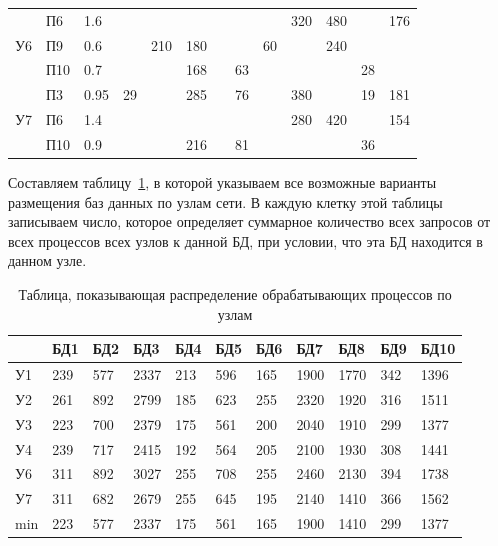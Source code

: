\documentclass[russian,utf8,emptystyle]{eskdtext}
\begin{document}
\begin{longtable}{p{0.6cm}|p{1cm}|p{1cm}|p{1cm}|p{1cm}|p{1cm}|p{1cm}|p{1cm}|p{1cm}|p{1cm}|p{1cm}|p{1cm}|p{1cm}}
\hline
\multirow{3}{*}{У6}&  П6         & 1.6   &     &      &      &      &      &      & 320  & 480  &      & 176   \\
                   &  П9         & 0.6   &     & 210  & 180  &      &      & 60   &      & 240  &      &       \\
                   &  П10        & 0.7   &     &      & 168  &      & 63   &      &      &      & 28   &       \\
\hline
\multirow{3}{*}{У7}&  П3         & 0.95  & 29  &      & 285  &      & 76   &      & 380  &      & 19   &  181  \\
                   &  П6         & 1.4   &     &      &      &      &      &      & 280  & 420  &      &  154  \\
                   &  П10        & 0.9   &     &      & 216  &      & 81   &      &      &      & 36   &       \\
\end{longtable}

Составляем таблицу~\ref{tab:bd-4}, в которой указываем все возможные варианты размещения баз данных по узлам сети. В каждую клетку этой таблицы записываем число, которое определяет суммарное количество всех запросов от всех процессов всех узлов к данной БД, при условии, что эта БД находится в данном узле.

\clearpage
\begin{longtable}{p{1cm}|p{1cm}|p{1cm}|p{1cm}|p{1cm}|p{1cm}|p{1cm}|p{1cm}|p{1cm}|p{1cm}|p{1cm}}
\caption{Таблица, показывающая распределение обрабатывающих процессов по узлам}
\label{tab:bd-4} \\
  &  БД1 & БД2 &  БД3 & БД4 & БД5 & БД6 &  БД7 &  БД8 & БД9 &  БД10 \\
\hline
У1 & 239 & 577 & 2337 & 213 & 596 & 165 & 1900 & 1770 & 342 & 1396   \\ \hline
У2 & 261 & 892 & 2799 & 185 & 623 & 255 & 2320 & 1920 & 316 & 1511   \\ \hline
У3 & 223 & 700 & 2379 & 175 & 561 & 200 & 2040 & 1910 & 299 & 1377   \\ \hline
У4 & 239 & 717 & 2415 & 192 & 564 & 205 & 2100 & 1930 & 308 & 1441   \\ \hline
У6 & 311 & 892 & 3027 & 255 & 708 & 255 & 2460 & 2130 & 394 & 1738   \\ \hline
У7 & 311 & 682 & 2679 & 255 & 645 & 195 & 2140 & 1410 & 366 & 1562   \\ \hline
\hline
min& 223 & 577 & 2337 & 175 & 561 & 165 & 1900 & 1410 & 299 & 1377  \\
\end{longtable}
\end{document}
